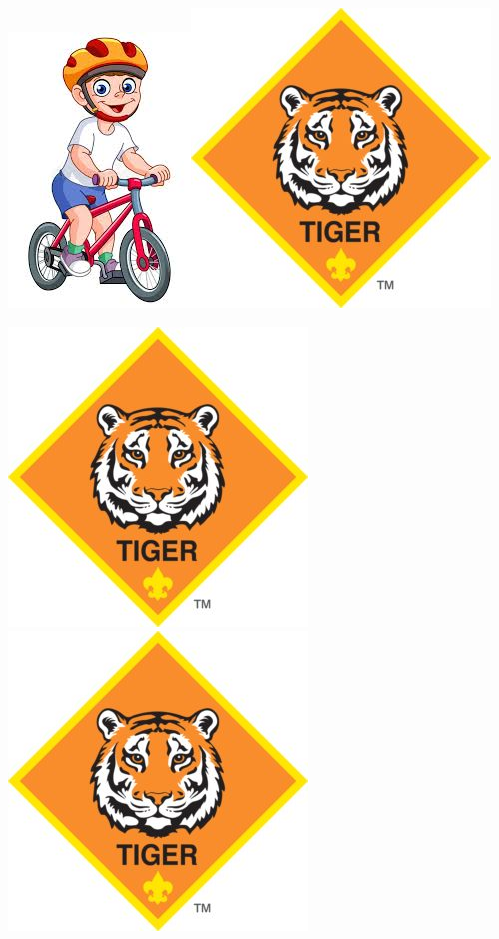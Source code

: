 \documentclass[12pt]{article}
\begin{document}
\noindent\includegraphics[width = .5\textwidth]{bike.jpg}\qquad\includegraphics[width = .5\textwidth]{TIGER-logo.jpg}

\noindent\includegraphics[width = .5\textwidth]{TIGER-logo.jpg}\qquad\includegraphics[width = .5\textwidth]{TIGER-logo.jpg}
\end{document}
